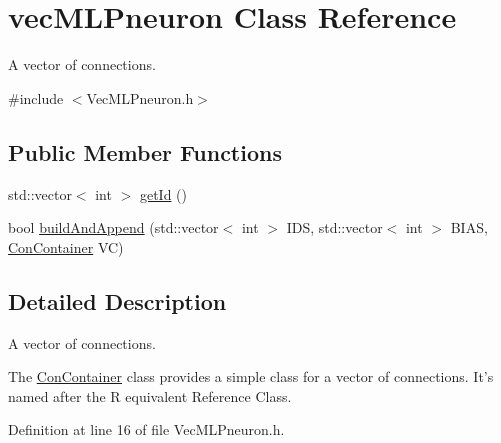 \hypertarget{classvec_m_l_pneuron}{
\section{vecMLPneuron Class Reference}
\label{classvec_m_l_pneuron}
}


A vector of connections.  




{\ttfamily \#include $<$VecMLPneuron.h$>$}

\subsection*{Public Member Functions}
\begin{DoxyCompactItemize}
\item 
std::vector$<$ int $>$ \hyperlink{classvec_m_l_pneuron_a6ca2656e3ef5998104dd08b80597c7b8}{getId} ()
\item 
bool \hyperlink{classvec_m_l_pneuron_a03f54489ffe29606bd279fa6282c31a7}{buildAndAppend} (std::vector$<$ int $>$ IDS, std::vector$<$ int $>$ BIAS, \hyperlink{class_con_container}{ConContainer} VC)
\end{DoxyCompactItemize}


\subsection{Detailed Description}
A vector of connections. 

The \hyperlink{class_con_container}{ConContainer} class provides a simple class for a vector of connections. It's named after the R equivalent Reference Class. 

Definition at line 16 of file VecMLPneuron.h.



